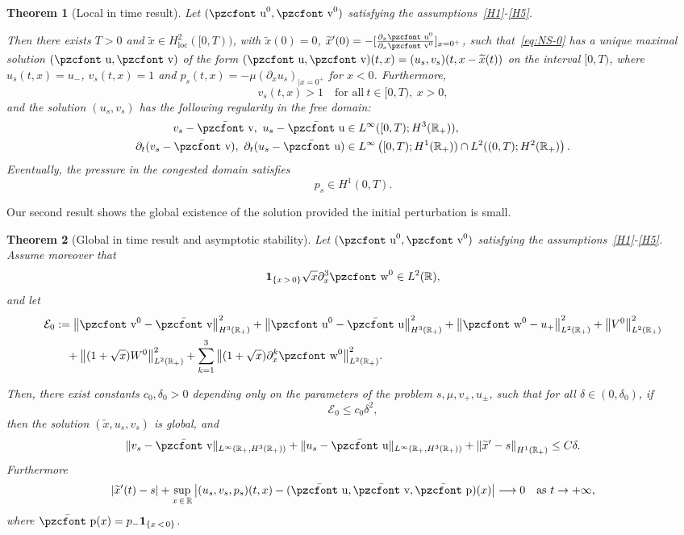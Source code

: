 \documentclass[10pt]{amsart}
\newtheorem{theo}{Theorem}[section]
\theoremstyle{definition}\newtheorem{defi}[theo]{Definition}\newtheorem{rema}[theo]{Remark}\newtheorem{exam}[theo]{Example}\newtheorem{exem}[theo]{Example}\newtheorem{nota}[theo]{Notation}
\newcommand{\mathpzc}[1]{\text{\pzcfont #1}}
\newcommand{\R}{\mathbb{R}}
\newcommand{\p}{\partial}
\newcommand{\bv}{\bar{\mathpzc{v}}}
\newcommand{\bu}{\bar{\mathpzc{u}}}
\newcommand{\bp}{\bar{\mathpzc{p}}}
\newcommand{\bfun}{\mathbf{1}}
\newcommand{\cE}{\mathcal E}
\newcommand{\rloc}{\mathrm{loc}}
\newcommand{\tv}{\mathpzc{v}}
\newcommand{\tu}{\mathpzc{u}}
\newcommand{\tw}{\mathpzc{w}}
\newcommand{\tx}{\widetilde{x}}
\begin{document}
\begin{theo}[Local in time result]
Let $(\tu^0, \tv^0)$ satisfying the assumptions~\eqref{H1}-\eqref{H5}.

Then there exists $T>0$ and $\tx \in H^2_\rloc([0,T))$, with $\tx(0) = 0$, $\tx'(0) = -[\frac{\partial_x\tu^0}{\partial_x \tv^0}]_{x=0^+}$, such that~\eqref{eq:NS-0} has a unique maximal solution $(\tu,\tv)$ of the form $(\tu,\tv)(t,x)= (u_s, v_s)(t, x-\tx(t))$ on the interval $[0, T)$, where $u_s(t,x)= u_-$, $v_s(t,x)= 1$ and $p_s(t,x) = -\mu (\partial_x u_s)_{|x=0^+}$ for $x<0$. Furthermore,
\begin{equation}
v_s(t,x) > 1 \quad \text{for all}~t\in [0,T),~x > 0,
\end{equation}
and the solution $(u_s,v_s)$ has the following regularity in the free domain:
\begin{align}
v_s - \bv, \ u_s -\bu &\in L^\infty([0,T); H^3(\R_+)), \\
\partial_t(v_s -\bv),~\partial_t(u_s-\bu)
&\in L^\infty\left([0,T);H^1(\R_+)) \cap L^2((0,T); H^2(\R_+)\right).
\end{align}
Eventually, the pressure in the congested domain satisfies
\begin{equation}\label{thm:main-loc}
p_s \in H^1(0,T).
\end{equation}
\end{theo}


Our second result shows the global existence of the solution provided the initial perturbation is small.


\begin{theo}[Global in time result and asymptotic stability]\label{thm:main-glob}
Let $(\tu^0, \tv^0)$ satisfying the assumptions~\eqref{H1}-\eqref{H5}. Assume moreover that
\begin{equation}
\bfun_{\{x\, >\,0\}} \sqrt{x} \partial^3_x \tw^0 \in L^2(\R),
\end{equation}
and let
\begin{align*}
\cE_0 & :=\left\|\tv^0 - \bv\right\|_{H^3(\R_+)}^2 + \left\|\tu^0-\bu\right\|_{H^3(\R_+)}^2 +\left\|\tw^0 - u_+\right\|_{L^2(\R_+)}^2 +\left\|V^0\right\|_{L^2(\R_+)}^2 \\
& \quad+ \left\|(1+\sqrt{x}) W^0\right\|_{L^2(\R_+)}^2+{
\sum_{k=1}^3 \left\|(1+\sqrt{x}) \p_x^k\tw^0\right\|_{L^2(\R_+)}^2}.
\end{align*}


Then, there exist constants $c_0,\delta_0 >0$ depending only on the parameters of the problem $s, \mu, v_+,u_\pm$, such that for all $\delta \in (0,\delta_0)$, if
\begin{equation}\label{hyp:small-glob}
\cE_0 \leq c_0 \delta^2,
\end{equation}
then the solution $(\tx,u_s,v_s)$ is global, and
\[
\|v_s-\bv\|_{L^\infty(\R_+, H^3(\R_+))} + \|u_s-\bu\|_{L^\infty(\R_+, H^3(\R_+))} +\left\|\tx'-s\right\|_{H^1(\R_+)}\leq C \delta.
\]
Furthermore
\begin{equation}
\left|\tx'(t) -s\right| + \sup_{x\,\in\,\R} \left|(u_s,v_s,p_s)(t,x) - (\bu, \bv,\bp)(x)\right| \longrightarrow 0 \quad \text{as}~t\to +\infty,
\end{equation}
where $\bp(x) = p_- \bfun_{\{x\,<\,0\}}$.
\end{theo}
\end{document}
